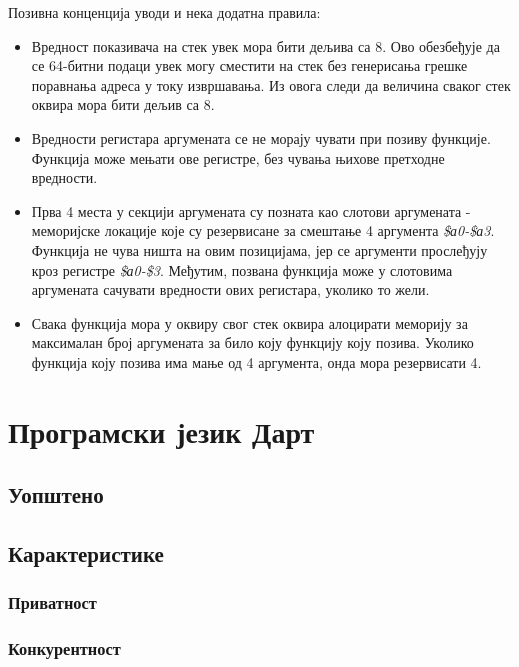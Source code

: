 \documentclass[12pt,oneside]{memoir}
\begin{document}
Позивна конценција уводи и нека додатна правила:
\begin{itemize}

\item Вредност показивача на стек увек мора бити дељива са 8. Ово обезбеђује да се 64-битни подаци увек могу сместити на стек без генерисања грешке поравнања адреса у току извршавања. Из овога следи да величина сваког стек оквира мора бити дељив са 8.

\item Вредности регистара аргумената се не морају чувати при позиву функције. Функција може мењати ове регистре, без чувања њихове претходне вредности.

\item Прва 4 места у секцији аргумената су позната као слотови аргумената - меморијске локације које су резервисане за смештање 4 аргумента \textit{\$а0-\$а3}. Функција не чува ништа на овим позицијама, јер се аргументи прослеђују кроз регистре \textit{\$а0-\$3}. Међутим, позвана функција може у слотовима аргумената сачувати вредности ових регистара, уколико то жели.

\item Свака функција мора у оквиру свог стек оквира алоцирати меморију за максималан број аргумената за било коју функцију коју позива. Уколико функција коју позива има мање од 4 аргумента, онда мора резервисати 4.
\end{itemize}


\chapter{Програмски језик Дарт}
\label{chp:dart}

\section{Уопштено}

\section{Карактеристике}

\subsection{Приватност}

\subsection{Конкурентност}
\end{document}
